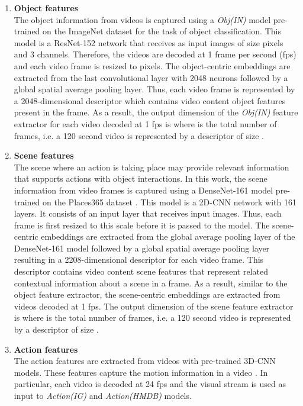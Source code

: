 \documentclass[review]{elsarticle}
\begin{document}
\begin{enumerate}[label = \Alph*.]

\item \textbf{Object features\\}
The object information from videos is captured using a \textit{Obj(IN)} model pre-trained on the ImageNet dataset \citep{deng2009imagenet} for the task of object classification. This model is a ResNet-152 network \citep{he2016deep} that receives as input images of size  pixels and 3 channels. Therefore, the videos are decoded at 1 frame per second (fps) and each video frame is resized to  pixels. The object-centric embeddings are extracted from the last convolutional layer with 2048 neurons followed by a global spatial average pooling layer. Thus, each video frame is represented by a 2048-dimensional descriptor which contains video content object features present in the frame. As a result, the output dimension of the \textit{Obj(IN)} feature extractor for each video decoded at 1 fps is  where  is the total number of frames, i.e. a 120 second video is represented by a descriptor of size .  

   


\item \textbf{Scene features\\}
The scene where an action is taking place may provide relevant information that supports actions with object interactions. In this work, the scene information from video frames is captured using a DenseNet-161 model \citep{huang2017densely} pre-trained on the Places365 dataset \citep{zhou2017places}. This model is a 2D-\ac{CNN} network with 161 layers. It consists of an input layer that receives  input images. Thus, each frame is first resized to this scale before it is passed to the model. The scene-centric embeddings are extracted from the  global average pooling layer of the DenseNet-161 model \citep{huang2017densely} followed by a global spatial average pooling layer resulting in a 2208-dimensional descriptor for each video frame. This descriptor contains video content scene features that represent related contextual information about a scene in a frame. As a result, similar to the object feature extractor, the scene-centric embeddings are extracted from  videos  decoded  at  1 fps. The output dimension of the scene feature extractor is  where  is the total number of frames, i.e. a 120 second video is represented by a descriptor of size .  

\item \textbf{Action features\\}
The action features are extracted from videos with pre-trained 3D-\ac{CNN} models. These features capture the motion information in a video \citep{carreira2017quo}. In particular, each video is decoded at 24 fps and the visual stream is used as input to \textit{Action(IG)} and \textit{Action(HMDB)} models.  


\end{enumerate}
\end{document}

